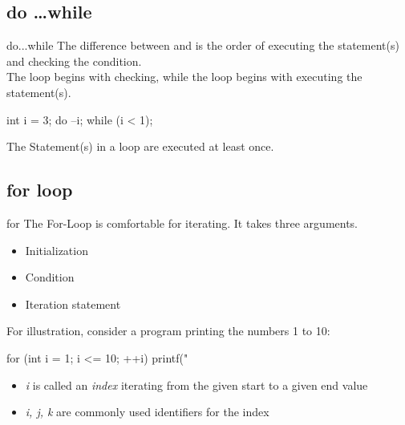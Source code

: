 \documentclass[10pt,graphics,aspectratio=169,table]{beamer}
\begin{document}
\subsection{do \ldots while}

\begin{frame}[fragile]{do...while}
    The difference between  and  is the order of executing the statement(s) and checking the condition.\\
    \bigskip
    The  loop begins with checking, while the  loop begins with executing the statement(s).
    \begin{codeblock}
int i = 3;
do {
    --i;
} while (i < 1);
\end{codeblock}
    \bigskip
    The Statement(s) in a  loop are executed at least once.
\end{frame}

\subsection{for loop}

\begin{frame}[fragile]{for}
    The For-Loop is comfortable for iterating. It takes three arguments.
    \begin{itemize}
        \item Initialization
        \item Condition
        \item Iteration statement
    \end{itemize}
    \bigskip
    For illustration, consider a program printing the numbers 1 to 10:
    \begin{codeblock}
for (int i = 1; i <= 10; ++i){
    printf("%
}
\end{codeblock}
    \begin{itemize}
        \item \textit{i} is called an \textit{index} iterating from the given start to a given end value
        \item \textit{i, j, k} are commonly used identifiers for the index
    \end{itemize}
\end{frame}
\end{document}
